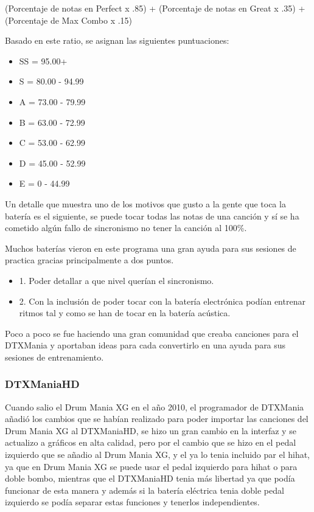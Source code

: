 \documentclass[a4paper,11pt,oneside]{book}
\begin{document}
     (Porcentaje de notas en Perfect x .85) + (Porcentaje de notas en Great x .35) + (Porcentaje de Max Combo x .15)

Basado en este ratio, se asignan las siguientes puntuaciones:

\begin{itemize}
  \item SS = 95.00+ 
  \item S = 80.00 - 94.99
  \item A = 73.00 - 79.99
  \item B = 63.00 - 72.99
  \item C = 53.00 - 62.99
  \item D = 45.00 - 52.99 
  \item E = 0 - 44.99 
\end{itemize}
    

Un detalle que muestra uno de los motivos que gusto a la gente que toca la batería es el siguiente, se puede tocar todas las notas de una canción y sí se ha cometido algún fallo de sincronismo no tener la canción al 100\%.

Muchos baterías vieron en este programa una gran ayuda para sus sesiones de practica gracias principalmente a dos puntos.

\begin{itemize}
\item   1. Poder detallar a que nivel querían el sincronismo.
\item   2. Con la inclusión de poder tocar con la batería electrónica podían entrenar ritmos tal y como se han de tocar en la batería acústica.
\end{itemize}

Poco a poco se fue haciendo una gran comunidad que creaba canciones para el DTXMania y aportaban ideas para cada convertirlo en una ayuda para sus sesiones de entrenamiento.


\subsubsection{DTXManiaHD}
Cuando salio el Drum Mania XG en el año 2010, el programador de DTXMania añadió los cambios que se habían realizado para poder importar las canciones del Drum Mania XG al DTXManiaHD, se hizo un gran cambio en la interfaz y se actualizo a gráficos en alta calidad, pero por el cambio que se hizo en el pedal izquierdo que se añadio al Drum Mania XG, y el ya lo tenia incluido par el hihat, ya que en Drum Mania XG se puede usar el pedal izquierdo para hihat o para doble bombo, mientras que el DTXManiaHD tenia más libertad ya que podía funcionar de esta manera y además si la batería eléctrica tenia doble pedal izquierdo se podía separar estas funciones y tenerlos independientes. 
\end{document}

